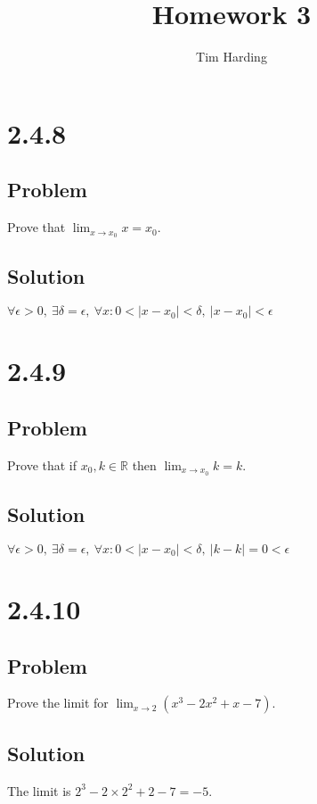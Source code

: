 \documentclass[12pt]{article}
\title{Homework 3}
\author{Tim Harding}
\newcommand{\round}[1]{\left(       #1 \right)      }
\newcommand{\abs}  [1]{\left|       #1 \right|      }
\newcommand{\R}    [0]{\mathbb{R}                   }
\begin{document}
\maketitle

\section*{2.4.8}

\subsection*{Problem}
Prove that $\lim_{x \to x_0} x = x_0$.

\subsection*{Solution}
$\forall \epsilon > 0,\ \exists \delta = \epsilon,\ \forall x : 0 < \abs{x - x_0} < \delta,\ \abs{x - x_0} < \epsilon$



\section*{2.4.9}

\subsection*{Problem}
Prove that if $x_0, k \in \R$ then $\lim_{x \to x_0} k = k$.

\subsection*{Solution}
$\forall \epsilon > 0,\ \exists \delta = \epsilon,\ \forall x : 0 < \abs{x - x_0} < \delta,\ \abs{k - k} = 0 < \epsilon$



\section*{2.4.10}

\subsection*{Problem}
Prove the limit for $\lim_{x \to 2} \round{x^3 - 2x^2 + x - 7}$.

\subsection*{Solution}
The limit is $2^3 - 2 \times 2^2 + 2 - 7 = -5$.
\end{document}
